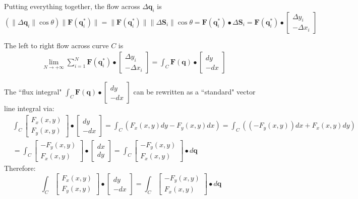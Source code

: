 \documentclass{article}
\begin{document}
Putting everything together, the flow across \(\Delta\mathbf{q}_i\) is 
\[(\|\Delta\mathbf{q}_i\|\cos\theta)\|\mathbf{F}(\mathbf{q}_i^*)\| = \|\mathbf{F}(\mathbf{q}_i^*)\|\|\Delta\mathbf{S}_i\|\cos\theta = \mathbf{F}(\mathbf{q}_i^*) \bullet \Delta\mathbf{S}_i = \mathbf{F}(\mathbf{q}_i^*) \bullet \begin{bmatrix} \Delta y_i \\ -\Delta x_i \end{bmatrix}\]

The left to right flow across curve \(C\) is
\begin{align*}
& \lim_{N \rightarrow +\infty} \sum_{i = 1}^N \mathbf{F}(\mathbf{q}_i^*) \bullet \begin{bmatrix} \Delta y_i \\ -\Delta x_i \end{bmatrix}
= \int_C \mathbf{F}(\mathbf{q}) \bullet \begin{bmatrix} dy \\ -dx \end{bmatrix}
\end{align*}

The ``flux integral" \(\int_C \mathbf{F}(\mathbf{q}) \bullet \begin{bmatrix} dy \\ -dx \end{bmatrix}\) can be rewritten as a ``standard" vector line integral via: 
\begin{align*}
& \int_C \begin{bmatrix} F_x(x,y) \\ F_y(x,y) \end{bmatrix} \bullet \begin{bmatrix} dy \\ -dx \end{bmatrix} 
= \int_C (F_x(x,y)dy - F_y(x,y)dx) 
= \int_C ((-F_y(x,y))dx + F_x(x,y)dy) \\
& = \int_C \begin{bmatrix} -F_y(x,y) \\ F_x(x,y) \end{bmatrix} \bullet \begin{bmatrix} dx \\ dy \end{bmatrix}
= \int_C \begin{bmatrix} -F_y(x,y) \\ F_x(x,y) \end{bmatrix} \bullet d\mathbf{q} 
\end{align*}
Therefore:
\[\int_C \begin{bmatrix} F_x(x,y) \\ F_y(x,y) \end{bmatrix} \bullet \begin{bmatrix} dy \\ -dx \end{bmatrix} = \int_C \begin{bmatrix} -F_y(x,y) \\ F_x(x,y) \end{bmatrix} \bullet d\mathbf{q}\]
\end{document}
